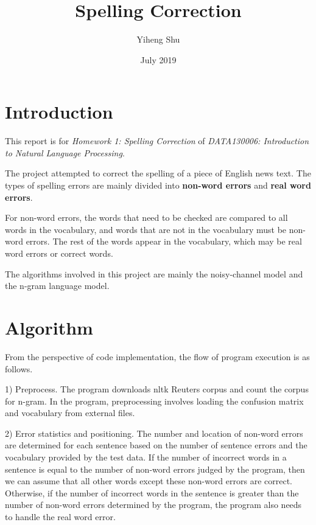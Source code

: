 \documentclass{article}
\title{Spelling Correction}
\author[*]{Yiheng Shu}
\affil[*]{Software College, Northeastern University, China}
\date{July 2019}
\begin{document}
\maketitle

\section{Introduction}

\label{sec:introduction} 

This report is for \textit{Homework 1: Spelling Correction} of \textit{DATA130006: Introduction to Natural Language
Processing}.

The project attempted to correct the spelling of a piece of English news text. The types of spelling errors are mainly divided into \textbf{non-word errors} and \textbf{real word errors}.

For non-word errors, the words that need to be checked are compared
to all words in the vocabulary, and words that are not in the vocabulary
must be non-word errors. The rest of the words appear in the vocabulary,
which may be real word errors or correct words.

The algorithms involved in this project are mainly the noisy-channel
model and the n-gram language model. 

\section{Algorithm}

\label{sec:algorithm}

From the perspective of code implementation, the flow of program execution
is as follows.

1) Preprocess. The program downloads nltk Reuters corpus and count the corpus for n-gram. In the program, preprocessing involves loading the confusion matrix and vocabulary from external files.

2) Error statistics and positioning. The number and location of non-word errors are determined for each sentence based on the number of sentence errors and the vocabulary provided by the test data. If the number of incorrect words in a sentence is equal to the number of non-word errors judged by the program, then we can assume that all other words except these non-word errors are correct. Otherwise, if the number of incorrect words in the sentence is greater than the number of non-word errors determined by the program, the program also needs to handle the real word error.
\end{document}
